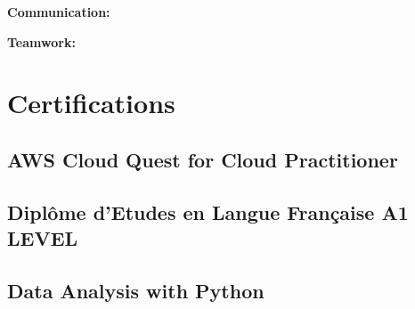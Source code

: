 \documentclass{article}
\begin{document}
\textbf{Communication:} \begin{itemize}[label=$\bullet$]
\end{itemize}

\textbf{Teamwork:} \begin{itemize}[label=$\bullet$]
\end{itemize}

\section{Certifications}
\subsection{AWS Cloud Quest for Cloud Practitioner}

\subsection{Diplôme d'Etudes en Langue Française A1 LEVEL}

\subsection{Data Analysis with Python}
\end{document}
